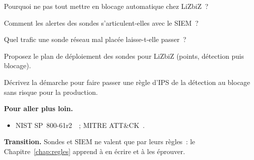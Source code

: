 \begin{boxexo}[title={\ding{45}\quad Exercice~6.6. Blocage \niveaumoyen}]
Pourquoi ne pas tout mettre en blocage automatique chez LiZbiZ~?
\end{boxexo}

\begin{boxexo}[title={\ding{45}\quad Exercice~6.7. SIEM \niveaumoyen}]
Comment les alertes des sondes s'articulent-elles avec le SIEM~?
\end{boxexo}

\begin{boxexo}[title={\ding{45}\quad Exercice~6.8. Angle mort \niveaumoyen}]
Quel trafic une sonde réseau mal placée laisse-t-elle passer~?
\end{boxexo}

\begin{boxexo}[title={\ding{45}\quad Exercice~6.9. Plan de déploiement \niveauexpert}]
Proposez le plan de déploiement des sondes pour LiZbiZ (points, détection
puis blocage).
\end{boxexo}

\begin{boxexo}[title={\ding{45}\quad Exercice~6.10. Passage au blocage \niveauexpert}]
Décrivez la démarche pour faire passer une règle d'IPS de la détection au
blocage sans risque pour la production.
\end{boxexo}

\bigskip

\begin{boxinfo}
\textbf{Pour aller plus loin.}
\begin{itemize}
    \item NIST SP~800-61r2~\cite{nist80061r2}~; MITRE ATT\&CK~\cite{mitreattack}.
\end{itemize}
\end{boxinfo}

\begin{boxinfo}
\textbf{Transition.} Sondes et SIEM ne valent que par leurs règles~: le
Chapitre~\ref{chap:regles} apprend à en écrire et à les éprouver.
\end{boxinfo}
